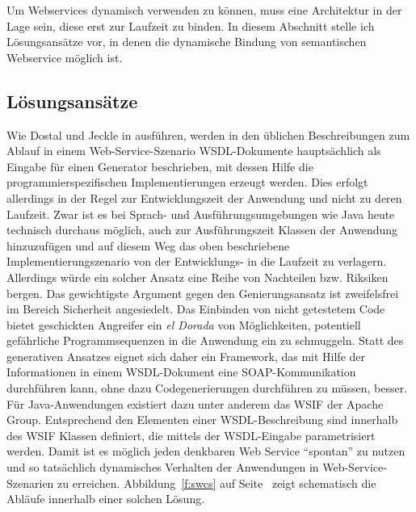 Um Webservices dynamisch verwenden zu können, muss eine Architektur in der Lage sein, diese erst zur Laufzeit zu binden. In diesem Abschnitt stelle ich Lösungsansätze vor, in denen die dynamische Bindung von semantischen Webservice möglich ist.

\subsection{Lösungsansätze}

Wie Dostal und Jeckle in \cite[S.61]{xmlspek4} ausführen, werden in den üblichen Beschreibungen zum Ablauf in einem Web-Service-Szenario \ac{WSDL}-Dokumente hauptsächlich als Eingabe für einen Generator beschrieben, mit dessen Hilfe die programmierspezifischen Implementierungen erzeugt werden. Dies erfolgt allerdings in der Regel zur Entwicklungszeit der Anwendung und nicht zu deren Laufzeit. Zwar ist es bei Sprach- und Ausführungsumgebungen wie Java heute technisch durchaus möglich, auch zur Ausführungszeit Klassen der Anwendung hinzuzufügen und auf diesem Weg das oben beschriebene Implementierungszenario von der Entwicklungs- in die Laufzeit zu verlagern. Allerdings würde ein solcher Ansatz eine Reihe von Nachteilen bzw. Riksiken bergen. Das gewichtigste Argument gegen den Genierungsansatz ist zweifelsfrei im Bereich Sicherheit angesiedelt. Das Einbinden von nicht getestetem Code bietet geschickten Angreifer ein \emph{el Dorada} von Möglichkeiten, potentiell gefährliche Programmsequenzen in die Anwendung ein zu schmuggeln. Statt des generativen Ansatzes eignet sich daher ein Framework, das mit Hilfe der Informationen in einem \ac{WSDL}-Dokument eine \ac{SOAP}-Kommunikation durchführen kann, ohne dazu Codegenerierungen durchführen zu müssen, besser. Für Java-Anwendungen existiert dazu unter anderem das \ac{WSIF} der Apache Group. Entsprechend den Elementen einer WSDL-Beschreibung sind innerhalb des \ac{WSIF} Klassen definiert, die mittels der \ac{WSDL}-Eingabe parametrisiert werden. Damit ist es möglich jeden denkbaren Web Service "`spontan"' zu nutzen und so tatsächlich dynamisches Verhalten der Anwendungen in Web-Service-Szenarien zu erreichen. Abbildung~\ref{f:swcs} auf Seite~\pageref{f:swcs} zeigt schematisch die Abläufe innerhalb einer solchen Lösung.

